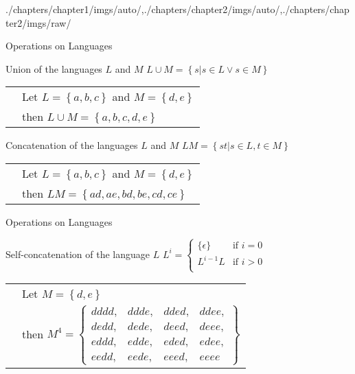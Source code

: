 \begin{graphicspathcontext}{{./chapters/chapter1/imgs/auto/},{./chapters/chapter2/imgs/auto/},{./chapters/chapter2/imgs/raw/}}
\begin{bibunit}[apalike]
\begin{frame}{Operations on Languages}
	\vspace{1cm}
	\begin{block}{Union of the languages $L$ and $M$}
		$L \cup M = \left\{s | s\in L \vee s \in M\right\}$
		\begin{tabularx}{\linewidth}{@{}lX@{}}
		\insertexamplelabel & Let $L = \left\{ a, b ,c \right\}$ and $M = \left\{ d, e \right\}$ \\
		& then $L \cup M = \left\{ a, b, c, d, e \right\}$
		\end{tabularx}
	\end{block}
	\vspace{.5cm}
	\begin{block}{Concatenation of the languages $L$ and $M$}
		$LM = \left\{st | s\in L, t \in M\right\}$
		\begin{tabularx}{\linewidth}{@{}lX@{}}
		\insertexamplelabel & Let $L = \left\{ a, b ,c \right\}$ and $M = \left\{ d, e \right\}$ \\
		& then $LM = \left\{ ad, ae, bd, be, cd, ce \right\}$
		\end{tabularx}
	\end{block}
\end{frame}

\begin{frame}{Operations on Languages \insertcontinuationtext}
	\begin{block}{Self-concatenation of the language $L$}
		$L^i = \begin{cases}
			\{\epsilon\} & \text{if }i=0 \\
			L^{i-1}L & \text{if }i>0 \\
			\end{cases}$
		\begin{tabularx}{\linewidth}{@{}lX@{}}
		\insertexamplelabel & Let $M = \left\{ d, e \right\}$ \\
		& then $M^4 = \left\{ \begin{array}{llllll}
			\scriptstyle dddd, & \scriptstyle ddde, & \scriptstyle dded, & \scriptstyle ddee, \\
			\scriptstyle dedd, & \scriptstyle dede, & \scriptstyle deed, & \scriptstyle deee, \\
			\scriptstyle eddd, & \scriptstyle edde, & \scriptstyle eded, & \scriptstyle edee, \\
			\scriptstyle eedd, & \scriptstyle eede, & \scriptstyle eeed, & \scriptstyle eeee \end{array} \right\}$
		\end{tabularx}
	\end{block}
\end{frame}


\end{bibunit}
\end{graphicspathcontext}
